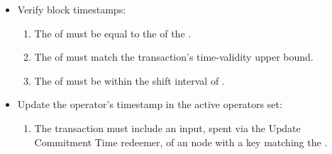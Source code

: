\documentclass[../midgard.tex]{subfiles}
\begin{document}
\begin{description}
\begin{itemize}
            \item Verify block timestamps:
            \begin{enumerate}[resume]
                \item The  of  must be equal to the  of the .
                \item The  of  must match the transaction's time-validity upper bound.
                \item The  of  must be within the shift interval of .
            \end{enumerate}
            
            \item Update the operator's timestamp in the active operators set:
            \begin{enumerate}[resume]
                \item The transaction must include an input, spent via the Update Commitment Time redeemer, of an  node with a key matching the .
            \end{enumerate}
        \end{itemize}


\end{description}
\end{document}
